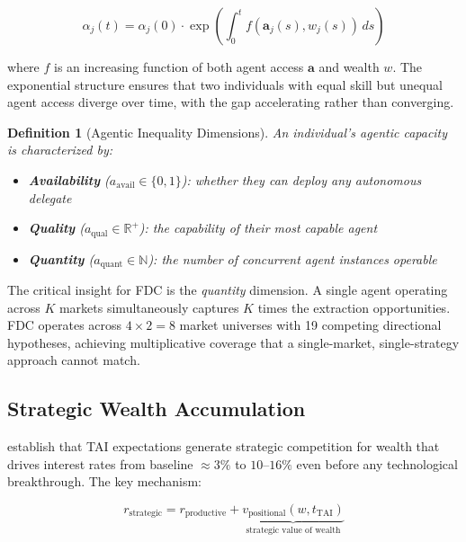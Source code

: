 \documentclass[11pt,a4paper]{article}
\newcommand{\R}{\mathbb{R}}
\newtheorem{definition}{Definition}[section]
\begin{document}
\begin{equation}\label{eq:agentic_inequality}
    \alpha_j(t) = \alpha_j(0) \cdot \exp\left(\int_0^t f(\mathbf{a}_j(s), w_j(s)) \, ds\right)
\end{equation}

\noindent where $f$ is an increasing function of both agent access $\mathbf{a}$ and wealth $w$. The exponential structure ensures that two individuals with equal skill but unequal agent access diverge over time, with the gap accelerating rather than converging.

\begin{definition}[Agentic Inequality Dimensions]
An individual's agentic capacity is characterized by:
\begin{itemize}
    \item \textbf{Availability} ($a_{\text{avail}} \in \{0,1\}$): whether they can deploy any autonomous delegate
    \item \textbf{Quality} ($a_{\text{qual}} \in \R^+$): the capability of their most capable agent
    \item \textbf{Quantity} ($a_{\text{quant}} \in \mathbb{N}$): the number of concurrent agent instances operable
\end{itemize}
\end{definition}

The critical insight for FDC is the \emph{quantity} dimension. A single agent operating across $K$ markets simultaneously captures $K$ times the extraction opportunities. FDC operates across $4 \times 2 = 8$ market universes with 19 competing directional hypotheses, achieving multiplicative coverage that a single-market, single-strategy approach cannot match.

\subsection{Strategic Wealth Accumulation}

\citet{maresca2025strategic} establish that TAI expectations generate strategic competition for wealth that drives interest rates from baseline $\approx 3\%$ to $10$--$16\%$ even before any technological breakthrough. The key mechanism:

\begin{equation}\label{eq:strategic_rate}
    r_{\text{strategic}} = r_{\text{productive}} + \underbrace{v_{\text{positional}}(w, t_{\text{TAI}})}_{\text{strategic value of wealth}}
\end{equation}
\end{document}
